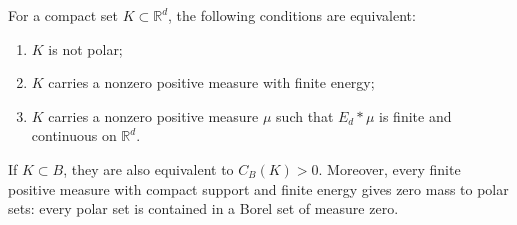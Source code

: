\begin{theorem}\label{thm:compact-polar-energy}
For a compact set $K\subset\mathbb R^d$, the following conditions are equivalent:
\begin{enumerate}
\item $K$ is not polar;
\item $K$ carries a nonzero positive measure with finite energy;
\item $K$ carries a nonzero positive measure $\mu$ such that $E_d*\mu$ is finite and continuous on $\mathbb R^d$.
\end{enumerate}
If $K\subset B$, they are also equivalent to $C_B(K)>0$. Moreover, every finite positive measure with compact support and finite energy gives zero mass to polar sets: every polar set is contained in a Borel set of measure zero.
\end{theorem}
